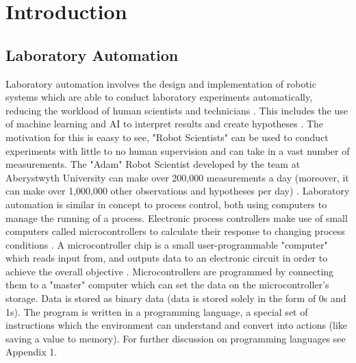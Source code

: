 \documentclass[a4]{report}
\def\achapter{preamble}
\begin{document}
	\newpage
	\setcounter{page}{1}
	
	\chapter*{Introduction}
	\def\achapter{Introduction}



	\section{Laboratory Automation}
	Laboratory automation involves the design and implementation of robotic systems which are able to conduct laboratory experiments automatically, reducing the workload of human scientists and technicians \cite{backwhatisauto}. This includes the use of machine learning and AI to interpret results and create hypotheses \cite{backlitrevai, backbaconauto, backlabauto}. The motivation for this is eaasy to see, "Robot Scientists" can be used to conduct experiments with little to no human supervision and can take in a vast number of measurements. The "Adam" Robot Scientist developed by the team at Aberystwyth University can make over 200,000 measurements a day (moreover, it can make over 1,000,000 other observations and hypotheses per day)  \cite{backontorobsci}. \newline \newline \noindent
	Laboratory automation is similar in concept to process control, both using computers to manage the running of a process. Electronic process controllers make use of small computers called microcontrollers to calculate their response to changing process conditions \cite{backprocautotheory}. A microcontroller chip is a small user-programmable "computer" which reads input from, and outputs data to an electronic circuit in order to achieve the overall objective \cite{backwhatismc}. Microcontrollers are programmed by connecting them to a "master" computer which can set the data on the microcontroller's storage. Data is stored as binary data (data is stored solely in the form of 0s and 1s). The program is written in a programming language, a special set of instructions which the environment can understand and convert into actions (like saving a value to memory). For further discussion on programming languages see Appendix 1.
\end{document}
